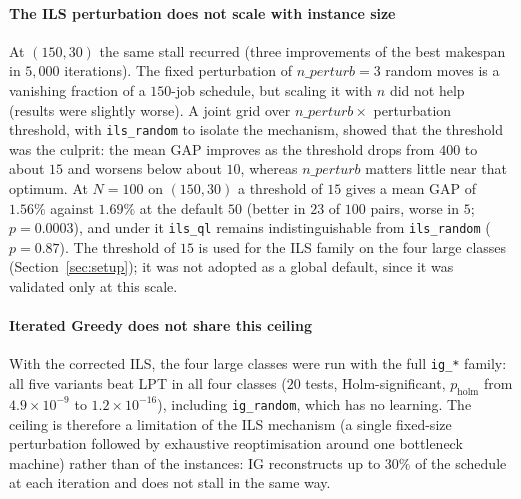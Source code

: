 \documentclass[final,3p,times,11pt,authoryear]{elsarticle}
\begin{document}
\paragraph{The ILS perturbation does not scale with instance size}
At $(150,30)$ the same stall recurred (three improvements of the best
makespan in $5{,}000$ iterations). The fixed perturbation of
$n\_perturb=3$ random moves is a vanishing fraction of a $150$-job
schedule, but scaling it with $n$ did not help (results were slightly
worse). A joint grid over $n\_perturb \times$ perturbation threshold, with
\texttt{ils\_random} to isolate the mechanism, showed that the threshold
was the culprit: the mean GAP improves as the threshold drops from $400$ to
about $15$ and worsens below about $10$, whereas $n\_perturb$ matters little
near that optimum. At $N=100$ on $(150,30)$ a threshold of $15$ gives a mean
GAP of $1.56\%$ against $1.69\%$ at the default $50$ (better in $23$ of
$100$ pairs, worse in $5$; $p=0.0003$), and under it \texttt{ils\_ql}
remains indistinguishable from \texttt{ils\_random} ($p=0.87$). The
threshold of $15$ is used for the ILS family on the four large classes
(Section~\ref{sec:setup}); it was not adopted as a global default, since it
was validated only at this scale.

\paragraph{Iterated Greedy does not share this ceiling}
With the corrected ILS, the four large classes were run with the full
\texttt{ig\_*} family: all five variants beat LPT in all four classes ($20$
tests, Holm-significant, $p_{\mathrm{holm}}$ from $4.9\times10^{-9}$ to
$1.2\times10^{-16}$), including \texttt{ig\_random}, which has no learning.
The ceiling is therefore a limitation of the ILS mechanism (a single
fixed-size perturbation followed by exhaustive reoptimisation around one
bottleneck machine) rather than of the instances: IG reconstructs up to
$30\%$ of the schedule at each iteration and does not stall in the same way.
\end{document}
